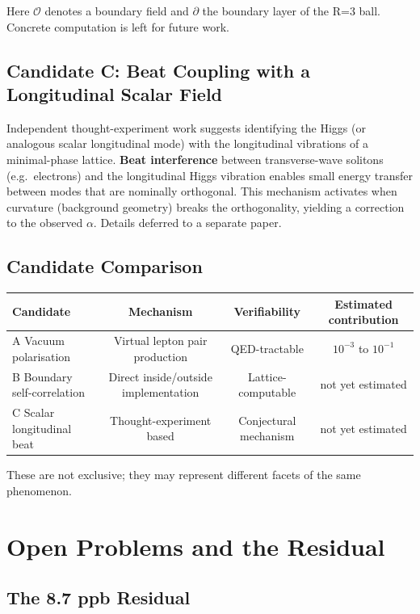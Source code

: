 \documentclass[a4paper,11pt]{article}
\begin{document}
Here $\mathcal{O}$ denotes a boundary field and $\partial$ the boundary layer of the R=3 ball. Concrete computation is left for future work.

\subsection{Candidate C: Beat Coupling with a Longitudinal Scalar Field}

Independent thought-experiment work suggests identifying the Higgs (or analogous scalar longitudinal mode) with the longitudinal vibrations of a minimal-phase lattice. \textbf{Beat interference} between transverse-wave solitons (e.g.\ electrons) and the longitudinal Higgs vibration enables small energy transfer between modes that are nominally orthogonal. This mechanism activates when curvature (background geometry) breaks the orthogonality, yielding a correction to the observed $\alpha$. Details deferred to a separate paper.

\subsection{Candidate Comparison}

\begin{center}
\begin{tabular}{lccc}
\toprule
Candidate & Mechanism & Verifiability & Estimated contribution \\
\midrule
A Vacuum polarisation & Virtual lepton pair production & QED-tractable & $10^{-3}$ to $10^{-1}$ \\
B Boundary self-correlation & Direct inside/outside implementation & Lattice-computable & not yet estimated \\
C Scalar longitudinal beat & Thought-experiment based & Conjectural mechanism & not yet estimated \\
\bottomrule
\end{tabular}
\end{center}

These are not exclusive; they may represent different facets of the same phenomenon.

\section{Open Problems and the Residual}

\subsection{The 8.7 ppb Residual}
\end{document}
